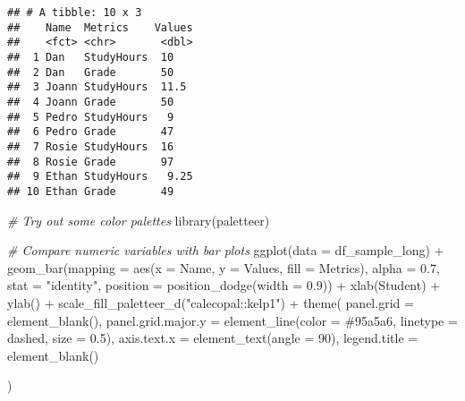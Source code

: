 \documentclass[
]{article}
\newenvironment{Shaded}{\begin{snugshade}}{\end{snugshade}}
\newcommand{\AttributeTok}[1]{\textcolor[rgb]{0.77,0.63,0.00}{#1}}
\newcommand{\CommentTok}[1]{\textcolor[rgb]{0.56,0.35,0.01}{\textit{#1}}}
\newcommand{\DecValTok}[1]{\textcolor[rgb]{0.00,0.00,0.81}{#1}}
\newcommand{\FloatTok}[1]{\textcolor[rgb]{0.00,0.00,0.81}{#1}}
\newcommand{\FunctionTok}[1]{\textcolor[rgb]{0.00,0.00,0.00}{#1}}
\newcommand{\NormalTok}[1]{#1}
\newcommand{\SpecialCharTok}[1]{\textcolor[rgb]{0.00,0.00,0.00}{#1}}
\newcommand{\StringTok}[1]{\textcolor[rgb]{0.31,0.60,0.02}{#1}}
\begin{document}
\begin{verbatim}
## # A tibble: 10 x 3
##    Name  Metrics    Values
##    <fct> <chr>       <dbl>
##  1 Dan   StudyHours  10   
##  2 Dan   Grade       50   
##  3 Joann StudyHours  11.5 
##  4 Joann Grade       50   
##  5 Pedro StudyHours   9   
##  6 Pedro Grade       47   
##  7 Rosie StudyHours  16   
##  8 Rosie Grade       97   
##  9 Ethan StudyHours   9.25
## 10 Ethan Grade       49
\end{verbatim}

\begin{Shaded}
\begin{Highlighting}[]
\CommentTok{\# Try out some color palettes}
\FunctionTok{library}\NormalTok{(paletteer)}

\CommentTok{\# Compare numeric variables with bar plots}
\FunctionTok{ggplot}\NormalTok{(}\AttributeTok{data =}\NormalTok{ df\_sample\_long) }\SpecialCharTok{+}
  \FunctionTok{geom\_bar}\NormalTok{(}\AttributeTok{mapping =} \FunctionTok{aes}\NormalTok{(}\AttributeTok{x =}\NormalTok{ Name, }\AttributeTok{y =}\NormalTok{ Values, }\AttributeTok{fill =}\NormalTok{ Metrics), }\AttributeTok{alpha =} \FloatTok{0.7}\NormalTok{, }\AttributeTok{stat =} \StringTok{"identity"}\NormalTok{, }\AttributeTok{position =} \FunctionTok{position\_dodge}\NormalTok{(}\AttributeTok{width =} \FloatTok{0.9}\NormalTok{)) }\SpecialCharTok{+}
  \FunctionTok{xlab}\NormalTok{(}\StringTok{\textquotesingle{}Student\textquotesingle{}}\NormalTok{) }\SpecialCharTok{+}
  \FunctionTok{ylab}\NormalTok{(}\StringTok{\textquotesingle{}\textquotesingle{}}\NormalTok{) }\SpecialCharTok{+}
  \FunctionTok{scale\_fill\_paletteer\_d}\NormalTok{(}\StringTok{"calecopal::kelp1"}\NormalTok{) }\SpecialCharTok{+}
  \FunctionTok{theme}\NormalTok{(}
    \AttributeTok{panel.grid =} \FunctionTok{element\_blank}\NormalTok{(),}
    \AttributeTok{panel.grid.major.y =} \FunctionTok{element\_line}\NormalTok{(}\AttributeTok{color =} \StringTok{\textquotesingle{}\#95a5a6\textquotesingle{}}\NormalTok{,}
                                      \AttributeTok{linetype =} \StringTok{\textquotesingle{}dashed\textquotesingle{}}\NormalTok{,}
                                      \AttributeTok{size =} \FloatTok{0.5}\NormalTok{),}
    \AttributeTok{axis.text.x =} \FunctionTok{element\_text}\NormalTok{(}\AttributeTok{angle =} \DecValTok{90}\NormalTok{),}
    \AttributeTok{legend.title =} \FunctionTok{element\_blank}\NormalTok{()}
    
\NormalTok{  )}
\end{Highlighting}
\end{Shaded}
\end{document}
